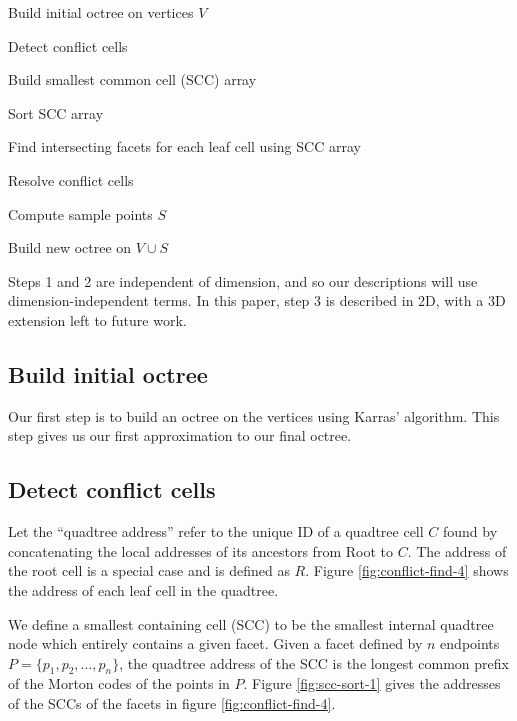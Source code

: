\documentclass[submission]{gmp2017}
\begin{document}
\begin{tightenumerate}
\item Build initial octree on vertices $V$
\item Detect conflict cells
  \begin{tightenumerate}
  \item Build smallest common cell (SCC) array
  \item Sort SCC array
  \item Find intersecting facets for each leaf cell using SCC array
  \end{tightenumerate}
\item Resolve conflict cells
  \begin{tightenumerate}
  \item Compute sample points $S$
  \item Build new octree on $V \cup S$
  \end{tightenumerate}
\end{tightenumerate}

Steps 1 and 2 are independent of dimension, and so our descriptions will use dimension-independent terms. In this paper, step 3 is described in 2D, with a 3D extension left to future work.

\subsection{Build initial octree}
Our first step is to build an octree on the vertices using Karras' algorithm. This step gives us our first approximation to our final octree.

\subsection{Detect conflict cells}

Let the ``quadtree address'' refer to the unique ID of a quadtree cell $C$ found by concatenating the local addresses of its ancestors from Root to $C$. The address of the root cell is a special case and is defined as $R$. Figure \ref{fig:conflict-find-4} shows the address of each leaf cell in the quadtree.

We define a smallest containing cell (SCC) to be the smallest internal quadtree node which entirely contains a given facet. Given a facet defined by $n$ endpoints $P=\{p_1, p_2, \dots, p_n\}$, the quadtree address of the SCC is the longest common prefix of the Morton codes of the points in $P$. Figure \ref{fig:scc-sort-1} gives the addresses of the SCCs of the facets in figure \ref{fig:conflict-find-4}.
\end{document}
